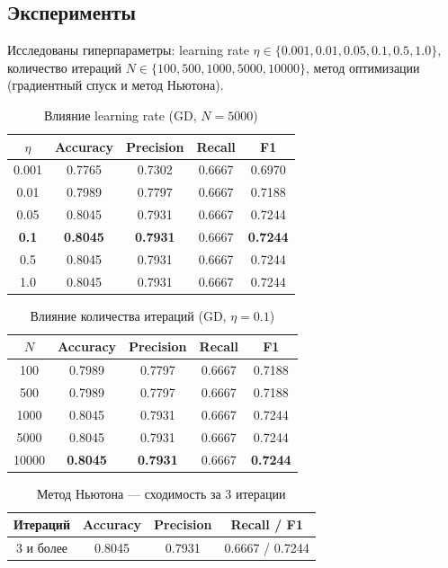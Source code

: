 \documentclass[12pt,a4paper]{article}
\begin{document}
\subsection{Эксперименты}

Исследованы гиперпараметры: learning rate
\(\eta \in \{0.001, 0.01, 0.05, 0.1, 0.5, 1.0\}\),
количество итераций \(N \in \{100, 500, 1000, 5000, 10000\}\),
метод оптимизации (градиентный спуск и метод Ньютона).

\begin{table}[H]\centering\small
\caption{Влияние learning rate (GD, \(N = 5000\))}\label{tab:lr-lr}
\begin{tabular}{ccccc}\toprule
\(\eta\) & Accuracy & Precision & Recall & F1 \\ \midrule
0.001 & 0.7765 & 0.7302 & 0.6667 & 0.6970 \\
0.01  & 0.7989 & 0.7797 & 0.6667 & 0.7188 \\
0.05  & 0.8045 & 0.7931 & 0.6667 & 0.7244 \\
\textbf{0.1} & \textbf{0.8045} & \textbf{0.7931} & 0.6667 & \textbf{0.7244} \\
0.5   & 0.8045 & 0.7931 & 0.6667 & 0.7244 \\
1.0   & 0.8045 & 0.7931 & 0.6667 & 0.7244 \\ \bottomrule
\end{tabular}
\end{table}

\begin{table}[H]\centering\small
\caption{Влияние количества итераций (GD, \(\eta = 0.1\))}\label{tab:lr-niter}
\begin{tabular}{ccccc}\toprule
\(N\) & Accuracy & Precision & Recall & F1 \\ \midrule
100   & 0.7989 & 0.7797 & 0.6667 & 0.7188 \\
500   & 0.7989 & 0.7797 & 0.6667 & 0.7188 \\
1000  & 0.8045 & 0.7931 & 0.6667 & 0.7244 \\
5000  & 0.8045 & 0.7931 & 0.6667 & 0.7244 \\
10000 & \textbf{0.8045} & \textbf{0.7931} & 0.6667 & \textbf{0.7244} \\ \bottomrule
\end{tabular}
\end{table}

\begin{table}[H]\centering\small
\caption{Метод Ньютона — сходимость за 3 итерации}
\begin{tabular}{cccc}\toprule
Итераций & Accuracy & Precision & Recall / F1 \\ \midrule
3 и более & 0.8045 & 0.7931 & 0.6667 / 0.7244 \\ \bottomrule
\end{tabular}
\end{table}
\end{document}
